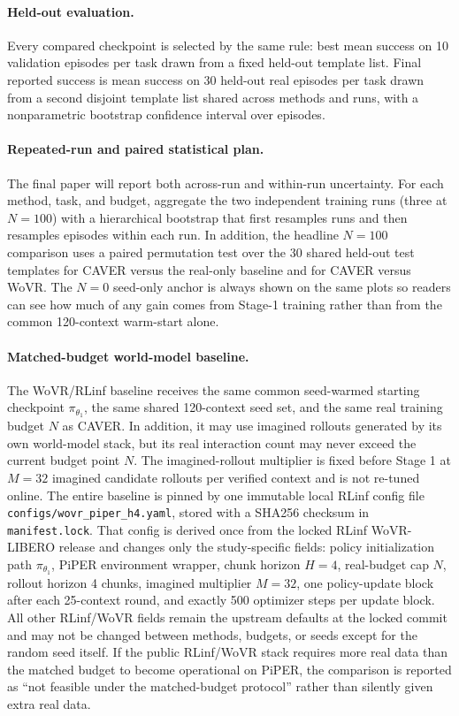 \documentclass[10pt]{article}
\theoremstyle{plain}
\theoremstyle{definition}
\theoremstyle{remark}
\begin{document}
\paragraph{Held-out evaluation.}
Every compared checkpoint is selected by the same rule: best mean success on 10 validation episodes per task drawn from a fixed held-out template list. Final reported success is mean success on 30 held-out real episodes per task drawn from a second disjoint template list shared across methods and runs, with a nonparametric bootstrap confidence interval over episodes.

\paragraph{Repeated-run and paired statistical plan.}
The final paper will report both across-run and within-run uncertainty. For each method, task, and budget, aggregate the two independent training runs (three at $N=100$) with a hierarchical bootstrap that first resamples runs and then resamples episodes within each run. In addition, the headline $N=100$ comparison uses a paired permutation test over the 30 shared held-out test templates for CAVER versus the real-only baseline and for CAVER versus WoVR. The $N=0$ seed-only anchor is always shown on the same plots so readers can see how much of any gain comes from Stage-1 training rather than from the common 120-context warm-start alone.


\paragraph{Matched-budget world-model baseline.}
The WoVR/RLinf baseline receives the same common seed-warmed starting checkpoint $\pi_{\theta_1}$, the same shared 120-context seed set, and the same real training budget $N$ as CAVER. In addition, it may use imagined rollouts generated by its own world-model stack, but its real interaction count may never exceed the current budget point $N$. The imagined-rollout multiplier is fixed before Stage 1 at $M=32$ imagined candidate rollouts per verified context and is not re-tuned online. The entire baseline is pinned by one immutable local RLinf config file \texttt{configs/wovr\_piper\_h4.yaml}, stored with a SHA256 checksum in \texttt{manifest.lock}. That config is derived once from the locked RLinf WoVR-LIBERO release and changes only the study-specific fields: policy initialization path $\pi_{\theta_1}$, PiPER environment wrapper, chunk horizon $H=4$, real-budget cap $N$, rollout horizon 4 chunks, imagined multiplier $M=32$, one policy-update block after each 25-context round, and exactly 500 optimizer steps per update block. All other RLinf/WoVR fields remain the upstream defaults at the locked commit and may not be changed between methods, budgets, or seeds except for the random seed itself. If the public RLinf/WoVR stack requires more real data than the matched budget to become operational on PiPER, the comparison is reported as ``not feasible under the matched-budget protocol'' rather than silently given extra real data.
\end{document}
